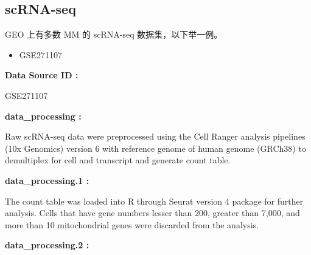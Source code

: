 \documentclass[
]{article}
\providecommand{\tightlist}{%
  \setlength{\itemsep}{0pt}\setlength{\parskip}{0pt}}
\begin{document}
\begin{center}\vspace{1.5cm}\end{center}

\hypertarget{scrna-seq}{%
\subsection{scRNA-seq}\label{scrna-seq}}

GEO 上有多数 MM 的 scRNA-seq 数据集，以下举一例。

\begin{itemize}
\tightlist
\item
  GSE271107
\end{itemize}

\begin{center}\begin{tcolorbox}[colback=gray!10, colframe=gray!50, width=0.9\linewidth, arc=1mm, boxrule=0.5pt]
\textbf{
Data Source ID
:}

\vspace{0.5em}

    GSE271107

\vspace{2em}


\textbf{
data\_processing
:}

\vspace{0.5em}

    Raw scRNA-seq data were preprocessed using the Cell
Ranger analysis pipelines (10x Genomics) version 6 with
reference genome of human genome (GRCh38) to demultiplex
for cell and transcript and generate count table.

\vspace{2em}


\textbf{
data\_processing.1
:}

\vspace{0.5em}

    The count table was loaded into R through Seurat
version 4 package for further analysis. Cells that have
gene numbers lesser than 200, greater than 7,000, and more
than 10%
mitochondrial genes were discarded from the analysis.

\vspace{2em}


\textbf{
data\_processing.2
:}

\vspace{0.5em}


\end{tcolorbox}
\end{center}
\end{document}
